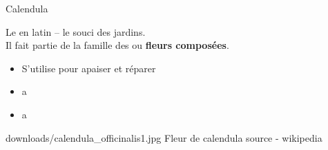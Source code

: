 

    
\ficheidentiteplante
{Calendula}
{%
    Le  en latin  – le souci des jardins.\\
    Il fait partie de la famille des  ou \textbf{fleurs composées}.

}
{%
    \begin{itemize}[label = \bcplume]
        \item S'utilise pour apaiser et réparer

    \end{itemize}
}
{%
    \begin{itemize}[label = \bcplume]
        \item a
    \end{itemize}
}
{%
    \begin{itemize}[label = \bccrayon]
        \item a
    \end{itemize}
}
{%
    

}
{%
    downloads/calendula_officinalis1.jpg
}
{%
    Fleur de calendula
}
{%
    source - wikipedia
}


